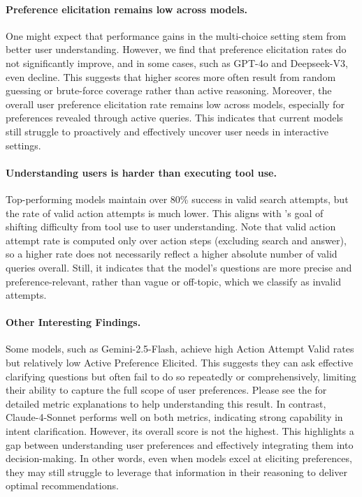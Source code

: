 \paragraph{Preference elicitation remains low across models.}  
One might expect that performance gains in the multi-choice setting stem from better user understanding. However, we find that preference elicitation rates do not significantly improve, and in some cases, such as GPT-4o and Deepseek-V3, even decline. This suggests that higher scores more often result from random guessing or brute-force coverage rather than active reasoning. Moreover, the overall user preference elicitation rate remains low across models, especially for preferences revealed through active queries. This indicates that current models still struggle to proactively and effectively uncover user needs in interactive settings.

\paragraph{Understanding users is harder than executing tool use.}  
Top-performing models maintain over 80\% success in valid search attempts, but the rate of valid action attempts is much lower. This aligns with {\gymname}’s goal of shifting difficulty from tool use to user understanding. Note that valid action attempt rate is computed only over action steps (excluding search and answer), so a higher rate does not necessarily reflect a higher absolute number of valid queries overall. Still, it indicates that the model’s questions are more precise and preference-relevant, rather than vague or off-topic, which we classify as invalid attempts.

\paragraph{Other Interesting Findings.} Some models, such as Gemini-2.5-Flash, achieve high Action Attempt Valid rates but relatively low Active Preference Elicited. This suggests they can ask effective clarifying questions but often fail to do so repeatedly or comprehensively, limiting their ability to capture the full scope of user preferences. Please see the  for detailed metric explanations to help understanding this result. In contrast, Claude-4-Sonnet performs well on both metrics, indicating strong capability in intent clarification. However, its overall score is not the highest. This highlights a gap between understanding user preferences and effectively integrating them into decision-making. In other words, even when models excel at eliciting preferences, they may still struggle to leverage that information in their reasoning to deliver optimal recommendations.

